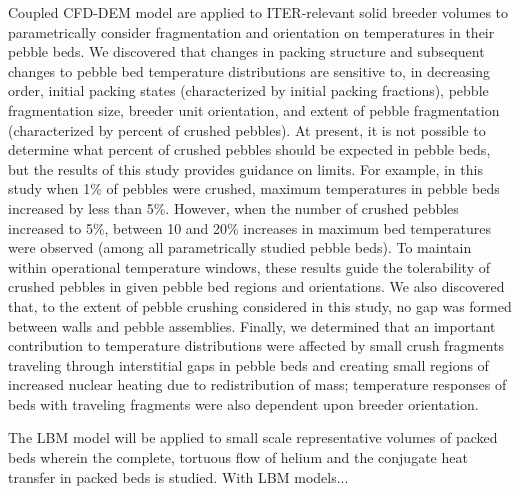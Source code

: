 Coupled CFD-DEM model are applied to ITER-relevant solid breeder volumes to parametrically consider fragmentation and orientation on temperatures in their pebble beds. We discovered that changes in packing structure and subsequent changes to pebble bed temperature distributions are sensitive to, in decreasing order, initial packing states (characterized by initial packing fractions), pebble fragmentation size, breeder unit orientation, and extent of pebble fragmentation (characterized by percent of crushed pebbles). At present, it is not possible to determine what percent of crushed pebbles should be expected in pebble beds, but the results of this study provides guidance on limits. For example, in this study when 1\% of pebbles were crushed, maximum temperatures in pebble beds increased by less than 5\%. However, when the number of crushed pebbles increased to 5\%, between 10 and 20\% increases in maximum bed temperatures were observed (among all parametrically studied pebble beds). To maintain within operational temperature windows, these results guide the tolerability of crushed pebbles in given pebble bed regions and orientations. We also discovered that, to the extent of pebble crushing considered in this study, no gap was formed between walls and pebble assemblies. Finally, we determined that an important contribution to temperature distributions were affected by small crush fragments traveling through interstitial gaps in pebble beds and creating small regions of increased nuclear heating due to redistribution of mass; temperature responses of beds with traveling fragments were also dependent upon breeder orientation.

The LBM model will be applied to small scale representative volumes of packed beds wherein the complete, tortuous flow of helium and the conjugate heat transfer in packed beds is studied. With LBM models...
